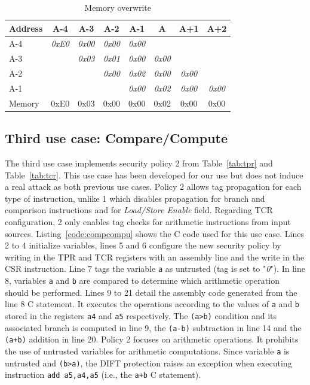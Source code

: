 \begin{table}[t]
    \centering
    \caption{Memory overwrite}
    \label{table:ftpdOverwriteMemory}
    \begin{tabular}{l|ccccccc}
        \toprule
        Address & A-4 & A-3 & A-2 & A-1 & A & A+1 & A+2 \\ \midrule
        A-4     & \textit{0xE0} & \textit{0x00} & \textit{0x00} & \textit{0x00} & \textit{}     & \textit{}     & \textit{}     \\
        A-3     & \textit{}     & \textit{0x03} & \textit{0x01} & \textit{0x00} & \textit{0x00} & \textit{}     & \textit{}     \\
        A-2     & \textit{}     & \textit{}     & \textit{0x00} & \textit{0x02} & \textit{0x00} & \textit{0x00} & \textit{}     \\
        A-1     & \textit{}     & \textit{}     & \textit{}     & \textit{0x00} & \textit{0x02} & \textit{0x00} & \textit{0x00} \\ \midrule
        Memory & {0xE0}    & {0x03}    & 0x00          & 0x00          & 0x02          & 0x00          & 0x00          \\
        \bottomrule
    \end{tabular}
\end{table}

\subsection{Third use case: Compare/Compute}

The third use case implements security policy 2 from Table~\ref{tab:tpr} and Table~\ref{tab:tcr}. This use case has been developed for our use but does not induce a real attack as both previous use cases.
Policy 2 allows tag propagation for each type of instruction, unlike 1 which disables propagation for branch and comparison instructions and for \textit{Load/Store Enable} field.
Regarding TCR configuration, 2 only enables tag checks for arithmetic instructions from input sources.
Listing~\ref{code:compcompu} shows the C code used for this use case. Lines 2 to 4 initialize variables, lines 5 and 6 configure the new security policy by writing in the TPR and TCR registers with an assembly line and the write in the CSR instruction. Line 7 tags the variable \verb|a| as untrusted (tag is set to "\textit{0}"). In line 8, variables \verb|a| and \verb|b| are compared to determine which arithmetic operation should be performed.
Lines 9 to 21 detail the assembly code generated from the line 8 C statement. It executes the operations according to the values of \verb|a| and \verb|b| stored in the registers \verb|a4| and \verb|a5| respectively. The \verb|(a>b)| condition and its associated branch is computed in line 9, the \verb|(a-b)| subtraction in line 14 and the \verb|(a+b)| addition in line 20.
Policy 2 focuses on arithmetic operations. It prohibits the use of untrusted variables for arithmetic computations. Since variable \verb|a| is untrusted and \verb|(b>a)|, the DIFT protection raises an exception when executing instruction \verb|add a5,a4,a5| (i.e., the \verb|a+b| C statement).

